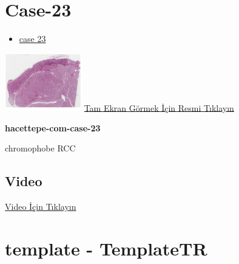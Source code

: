 \documentclass[
  letterpaper,
  DIV=11,
  numbers=noendperiod]{scrreprt}
\providecommand{\tightlist}{%
  \setlength{\itemsep}{0pt}\setlength{\parskip}{0pt}}\usepackage{longtable,booktabs,array}
\begin{document}
\hypertarget{sec-hacettepe-case-of-the-month-case-23}{%
\section{Case-23}\label{sec-hacettepe-case-of-the-month-case-23}}

\begin{itemize}
\tightlist
\item
  \href{https://www.youtube.com/watch?v=2j0ER0ShVR0&ab_channel=KemalKosemehmetoglu}{case
  23}
\end{itemize}

\href{https://images.patolojiatlasi.com/hacettepe-com-case-23/HE.html}{\includegraphics[width=0.25\textwidth,height=\textheight]{./screenshots/thumbnail_hacettepe-com-case-23.png}}
\href{https://images.patolojiatlasi.com/hacettepe-com-case-23/HE.html}{Tam
Ekran Görmek İçin Resmi Tıklayın}

\textbf{hacettepe-com-case-23}

\begin{tcolorbox}[enhanced jigsaw, breakable, opacitybacktitle=0.6, arc=.35mm, colbacktitle=quarto-callout-tip-color!10!white, colback=white, toptitle=1mm, left=2mm, opacityback=0, colframe=quarto-callout-tip-color-frame, titlerule=0mm, rightrule=.15mm, bottomrule=.15mm, toprule=.15mm, bottomtitle=1mm, title=\textcolor{quarto-callout-tip-color}{\faLightbulb}\hspace{0.5em}{Tanı}, coltitle=black, leftrule=.75mm]

chromophobe RCC

\end{tcolorbox}

\hypertarget{video-22}{%
\subsection{Video}\label{video-22}}

\href{https://www.youtube.com/watch?v=2j0ER0ShVR0}{Video İçin Tıklayın}

\hypertarget{sec-template}{%
\section{template - TemplateTR}\label{sec-template}}
\end{document}
